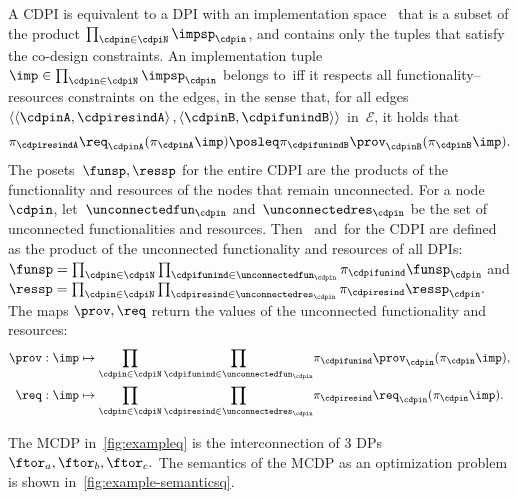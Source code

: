 A CDPI is equivalent to a DPI with an implementation space~\impsp
that is a subset of the product $\prod_{\cdpin\in\cdpiN}\impsp_{\cdpin}$,
and contains only the tuples that satisfy the co-design constraints.
An implementation tuple~$\imp\in\prod_{\cdpin\in\cdpiN}\impsp_{\cdpin}$
belongs to~\impsp iff it respects all functionality--resources
constraints on the edges, in the sense that, for all edges~$\left\langle \left\langle \cdpinA,\cdpiresindA\right\rangle ,\left\langle \cdpinB,\cdpifunindB\right\rangle \right\rangle $
in~$\mathcal{E}$, it holds that
\[
    \pi_{\cdpiresindA}\req_{\cdpinA}(\pi_{\cdpinA}\imp)\posleq\pi_{\cdpifunindB}\prov_{\cdpinB}(\pi_{\cdpinB}\imp).
\]
The posets~$\funsp,\ressp$ for the entire CDPI are the products
of the functionality and resources of the nodes that remain unconnected.
For a node~$\cdpin$, let~$\unconnectedfun_{\cdpin}$ and~$\unconnectedres_{\cdpin}$
be the set of unconnected functionalities and resources. Then~\funsp
and~\ressp for the CDPI are defined as the product of the unconnected
functionality and resources of all DPIs: $\funsp=\prod_{\cdpin\in\cdpiN}\prod_{\cdpifunind\in\unconnectedfun_{\cdpin}}\pi_{\cdpifunind}\funsp_{\cdpin}$
and $\ressp=\prod_{\cdpin\in\cdpiN}\prod_{\cdpiresind\in\unconnectedres_{\cdpin}}\pi_{\cdpiresind}\ressp_{\cdpin}.$
The maps $\prov,\req$ return the values of the unconnected functionality
and resources:
\begin{align*}
    \prov:\imp & \mapsto{\scriptstyle {\displaystyle \prod_{\cdpin\in\cdpiN}\prod_{\cdpifunind\in\unconnectedfun_{\cdpin}}}}\pi_{\cdpifunind}\prov_{\cdpin}(\pi_{\cdpin}\imp),\\
    \req:\imp & \mapsto{\displaystyle \prod_{\cdpin\in\cdpiN}\prod_{\cdpiresind\in\unconnectedres_{\cdpin}}}\pi_{\cdpiresind}\req_{\cdpin}(\pi_{\cdpin}\imp).
\end{align*}

\begin{example}
    The MCDP in~\cref{fig:exampleq} is the interconnection of 3
    DPs $\ftor_{a},\ftor_{b},\ftor_{c}.$ The semantics of the MCDP as
    an optimization problem is shown in~\cref{fig:example-semanticsq}.
\end{example}

\\




